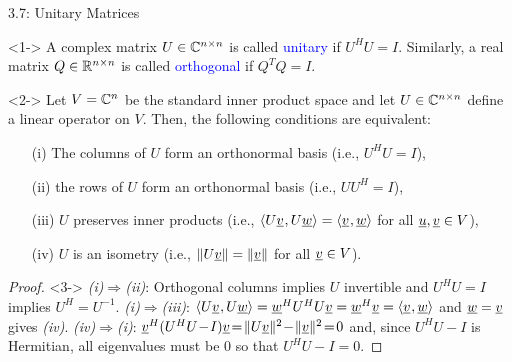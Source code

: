 \documentclass[10pt,english,aspectratio=169]{beamer}
\begin{document}
\begin{frame}{3.7: Unitary Matrices}

\vspace{-1.5mm}

\begin{definition}<1->
A complex matrix $U\in \mathbb{C}^{n\times n}$ is called \textcolor{blue}{unitary} if $U^H U = I$.
Similarly, a real matrix $Q\in \mathbb{R}^{n\times n}$ is called \textcolor{blue}{orthogonal} if $Q^T Q = I$.
\end{definition}

\vspace{-1.5mm}

\begin{theorem}<2->
Let $V = \mathbb{C}^n$ be the standard inner product space and let  $U\in \mathbb{C}^{n\times n}$ define a linear operator on $V$.
Then, the following conditions are equivalent:
\begin{enumerate}
\setlength\itemsep{0.5mm}
\item[(i)] The columns of $U$ form an orthonormal basis (i.e.,  $U^H U = I$),
\item[(ii)] the rows of $U$ form an orthonormal basis (i.e.,  $U U^H = I$),
\item[(iii)] $U$ preserves inner products (i.e., ${\langle  U \underline{v}  \mskip1mu ,  U \underline{w}  \rangle} = {\langle  \underline{v}  \mskip1mu ,  \underline{w}  \rangle}$ for all $\underline{u},\underline{v}\in V$),
\item[(iv)] $U$ is an isometry (i.e., $\| U \underline{v} \| = \| \underline{v}\|$ for all $\underline{v} \in V$).
\end{enumerate}
\end{theorem}

\vspace{-1.5mm}

\begin{proof}<3->
{\it(i)}$\Rightarrow${\it(ii)}: Orthogonal columns implies $U$ invertible and $U^H U = I$ implies $U^H = U^{-1}$.
{\it(i)}$\Rightarrow${\it(iii)}: ${\langle  U \underline{v}  \mskip1mu ,  U \underline{w}  \rangle} = \underline{w}^H U^H U \underline{v} = \underline{w}^H \underline{v} = {\langle  \underline{v}  \mskip1mu ,  \underline{w}  \rangle}$ and $\underline{w}=\underline{v}$ gives {\it(iv)}.
{\it(iv)}$\Rightarrow${\it(i)}:
$\vecnot{v}^H (U^H U \!-\! I) \vecnot{v} \!=\! \| U \vecnot{v} \|^2 \!-\! \| \vecnot{v} \|^2 \!=\! 0$
and, since $U^H U \!-\! I$ is Hermitian, all eigenvalues must be 0 so that $U^H U - I = 0$.
\end{proof}

\end{frame}
\end{document}
